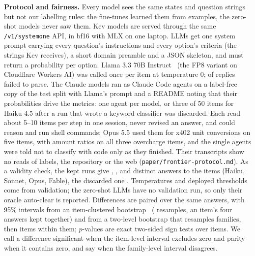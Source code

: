 \documentclass[conference]{IEEEtran}
\newcommand{\FrontierProtocol}{The Claude models ran as Claude Code agents on a label-free copy of the test split with
Llama's prompt and a README noting that their probabilities drive the metrics: one agent per model, or three of 50
items for Haiku 4.5 after a run that wrote a keyword classifier was discarded. Each read about 5--10 items per step in
one session, never revised an answer, and could reason and run shell commands; Opus 5.5 used them for x402 unit
conversions on five items, with amount ratios on all three overcharge items, and the single agents were told not to
classify with code only as they finished. Their transcripts show no reads of labels, the repository or the web (\texttt{paper/frontier-protocol.md}).}
\begin{document}
\textbf{Protocol and fairness.} Every model sees the same states and question strings but not our labelling rules: the
fine-tunes learned them from \NNTrain{} examples, the zero-shot models never saw them. Kev models are served through the
same \texttt{/v1/systemone} API, in bf16 with MLX on one laptop. LLMs get one system prompt carrying every question's
instructions and every option's criteria (the strings Kev receives), a short domain preamble and a JSON skeleton, and
must return a probability per option. Llama 3.3 70B Instruct~\cite{meta2024llama33} (the FP8 variant on Cloudflare
Workers AI) was called once per item at temperature 0; \NLlamaParseErrors{} of \NNTest{} replies failed to parse.
\FrontierProtocol{} As a validity check, the kept runs give \NHaikuDistinct{}, \NSonnetDistinct{}, \NOpusDistinct{} and
\NFableDistinct{} distinct answers to the \NNTest{} items (Haiku, Sonnet, Opus, Fable), the discarded one
\NDiscardedDistinct{}. Temperatures and deployed thresholds come from validation; the zero-shot LLMs have no validation
run, so only their oracle auto-clear is reported. Differences are paired over the same answers, with 95\% intervals
from an item-clustered bootstrap~\cite{efron1979bootstrap} (\NResamples{} resamples, an item's four answers kept
together) and from a two-level bootstrap that resamples families, then items within them; $p$-values are exact
two-sided sign tests over items. We call a difference significant when the item-level interval excludes zero and
parity when it contains zero, and say when the family-level interval disagrees.
\end{document}
